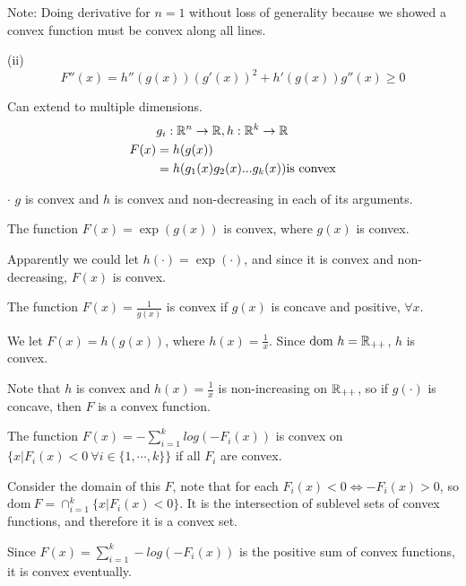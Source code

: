 Note: Doing derivative for $n=1$ without loss of generality because we showed a convex function must be convex along all lines. 



(ii) 
\begin{equation*}
F''(x) = h''(g(x))(g'(x))^2 + h'(g(x))g''(x) \geq 0
\end{equation*}

Can extend to multiple dimensions.
\begin{align*}
&g_i:\mathbb{R}^n\rightarrow \mathbb{R}, h:\mathbb{R}^k\rightarrow \mathbb{R}\\
F(x) &= h(g(x))\\
&= h(g_1(x) g_2(x)...g_k(x)) \text{is convex}
\end{align*}

$\cdot$ $g$ is convex and $h$ is convex and non-decreasing in each of its arguments. 



\begin{example}
	
	The function $F(x) = \exp(g(x))$ is convex, where $g(x)$ is convex. 
	
	Apparently we could let $h(\cdot) = \exp(\cdot)$, and since it is convex and non-decreasing, $F(x)$ is convex. 
\end{example}


\begin{example}
	
	The function $F(x) = \frac{1}{g(x)}$ is convex if $g(x)$ is concave and positive, $\forall x$. 
	
	We let $F(x) = h(g(x))$, where $h(x) = \frac{1}{x}$. Since $\text{dom}\ h = \mathbb{R}_{++}$, $h$ is convex.
	
	Note that $h$ is convex and $h(x) = \frac{1}{x}$ is non-increasing on $\mathbb{R}_{++}$, so if $g(\cdot)$ is concave, then $F$ is a convex function.
\end{example}


\begin{example}
	The function $F(x) = -\sum^k_{i=1}log(-F_i(x))$ is convex on $\{x\vert F_i(x)<0\ \forall i\in \{1,\cdots,k \}  \}$ if all $F_i$ are convex.
	
	Consider the domain of this $F$, note that for each $F_i(x)<0\Leftrightarrow -F_i(x) >0$, so $\text{dom}\ F = \cap^k_{i=1}\{x\vert F_i(x) <0 \}$. It is the intersection of sublevel sets of convex functions, and therefore it is a convex set.
		
	Since $F(x) = \sum^k_{i=1} -log(-F_i(x))$ is the positive sum of convex functions, it is convex eventually.
\end{example}
